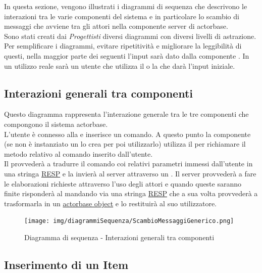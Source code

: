 \documentclass{scalatekids-article}
\begin{document}
In questa sezione, vengono illustrati i diagrammi di sequenza che descrivono
le interazioni tra le varie componenti del sistema e in particolare lo scambio
di messaggi che avviene tra gli attori nella componente server di actorbase.\\
Sono stati creati dai \textit{Progettisti} diversi diagrammi con diversi livelli
di astrazione.\\
Per semplificare i diagrammi, evitare ripetitività e migliorare la leggibilità di
questi, nella maggior parte dei seguenti l'input sarà dato dalla componente . In un utilizzo reale sarà un utente che utilizza il  o la
 che darà l'input iniziale.

\subsection{Interazioni generali tra componenti}
Questo diagramma rappresenta l'interazione generale tra le tre componenti che
compongono il sistema actorbase.\\
L'utente è connesso alla  e inserisce un comando. A questo punto la
componente  (se non è instanziato un  lo crea per poi
utilizzarlo) utilizza il  per richiamare il metodo relativo al
comando inserito dall'utente.\\Il {} provvederà a tradurre il
comando coi relativi parametri immessi dall'utente in una stringa
\hyperref[sec:RESP]{RESP} e la invierà al server attraverso un . Il server provvederà a fare le elaborazioni richieste attraverso l'uso
degli attori e quando queste saranno finite risponderà al 
mandando via  una stringa \hyperref[sec:RESP]{RESP} che a sua
volta provvederà a trasformarla in un
\hyperref[sec:driver::actorbasedata::actorbaseobject]{actorbase object} e lo
restituirà al suo utilizzatore.
\begin{figure}[H]
  \begin{center}
    \texttt{[image: img/diagrammiSequenza/ScambioMessaggiGenerico.png]}
    \caption{Diagramma di sequenza - Interazioni generali tra componenti}
  \end{center}
\end{figure}

\subsection{Inserimento di un Item}
\end{document}
